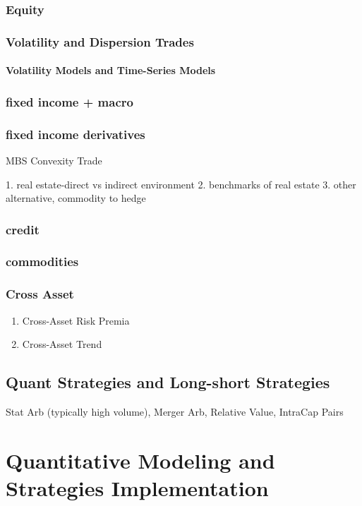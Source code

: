 \documentclass[11pt, openany]{book}              %
\begin{document}
\section{Equity}
\section{Volatility and Dispersion Trades}
	\subsection{Volatility Models and Time-Series Models}
	
\section{fixed income + macro}
\section{fixed income derivatives}

MBS Convexity Trade

    1. real estate-direct vs indirect environment  
    2. benchmarks of real estate
    3. other alternative, commodity to hedge

\section{credit}
\section{commodities} 
\section{Cross Asset}

\begin{enumerate}
 \item Cross-Asset Risk Premia
 \item Cross-Asset Trend
\end{enumerate}


\chapter{Quant Strategies and Long-short Strategies}

Stat Arb (typically high volume), Merger Arb, Relative Value, IntraCap Pairs 
 

\part{Quantitative Modeling and Strategies Implementation}
\end{document}
